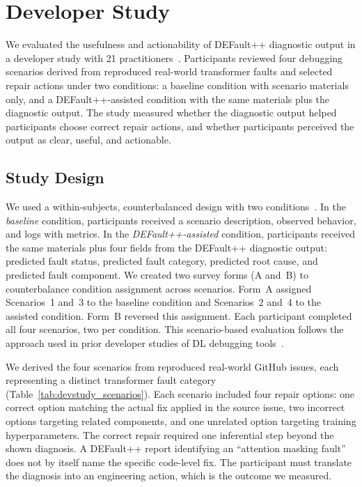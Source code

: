 \section{Developer Study}
\label{sec:defaultpp_devstudy}

We evaluated the usefulness and actionability of DEFault++ diagnostic output in a developer study with 21 practitioners~\cite{amershi2019software}. Participants reviewed four debugging scenarios derived from reproduced real-world transformer faults and selected repair actions under two conditions: a baseline condition with scenario materials only, and a DEFault++-assisted condition with the same materials plus the diagnostic output. The study measured whether the diagnostic output helped participants choose correct repair actions, and whether participants perceived the output as clear, useful, and actionable.

\subsection{Study Design}
\label{sec:defaultpp_devstudy_design}

We used a within-subjects, counterbalanced design with two conditions~\cite{wohlin2012experimentation}. In the \emph{baseline} condition, participants received a scenario description, observed behavior, and logs with metrics. In the \emph{DEFault++-assisted} condition, participants received the same materials plus four fields from the DEFault++ diagnostic output: predicted fault status, predicted fault category, predicted root cause, and predicted fault component. We created two survey forms (A and~B) to counterbalance condition assignment across scenarios. Form~A assigned Scenarios~1 and~3 to the baseline condition and Scenarios~2 and~4 to the assisted condition. Form~B reversed this assignment. Each participant completed all four scenarios, two per condition. This scenario-based evaluation follows the approach used in prior developer studies of DL debugging tools~\cite{umlaut,kunit}.

We derived the four scenarios from reproduced real-world GitHub issues, each representing a distinct transformer fault category (Table~\ref{tab:devstudy_scenarios}). Each scenario included four repair options: one correct option matching the actual fix applied in the source issue, two incorrect options targeting related components, and one unrelated option targeting training hyperparameters. The correct repair required one inferential step beyond the shown diagnosis. A DEFault++ report identifying an ``attention masking fault'' does not by itself name the specific code-level fix. The participant must translate the diagnosis into an engineering action, which is the outcome we measured.

